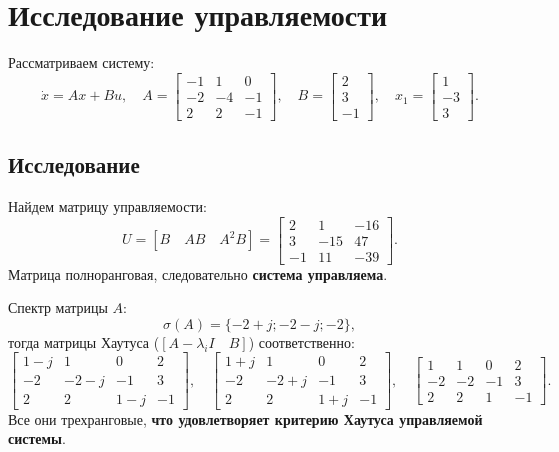 \section{Исследование управляемости}

Рассматриваем систему:
\begin{equation*}
    \dot x=Ax+Bu,\quad
    A=\begin{bmatrix}
        -1 & 1 & 0 \\ -2 & -4 & -1 \\ 2 & 2 & -1
    \end{bmatrix},\quad
    B=\begin{bmatrix}
        2 \\ 3 \\ -1
    \end{bmatrix},\quad
    x_1=\begin{bmatrix}
        1 \\ -3 \\ 3
    \end{bmatrix}.
\end{equation*}

\subsection{Исследование}

Найдем матрицу управляемости:
\begin{equation*}
    U=[B\quad AB\quad A^2B]=
    \begin{bmatrix}
        2 & 1 & -16 \\ 3 & -15 & 47 \\ -1 & 11 & -39
    \end{bmatrix}.
\end{equation*}
Матрица полноранговая, следовательно \textbf{система управляема}.

Спектр матрицы $A$:
$$\sigma(A)=\{ -2 + j; -2-j; -2\},$$
тогда матрицы Хаутуса ($[A-\lambda_iI\quad B]$) соответственно:
\begin{equation*}
    \begin{bmatrix}
        1-j&1&0&2\\-2&-2-j&-1&3\\2&2&1-j&-1
    \end{bmatrix},\quad 
    \begin{bmatrix}
        1+j&1&0&2\\-2&-2+j&-1&3\\2&2&1+j&-1
    \end{bmatrix},\quad
    \begin{bmatrix}
        1 & 1 & 0 & 2 \\
        -2 & -2 & -1 & 3 \\
        2 & 2 & 1 & -1
    \end{bmatrix}.
\end{equation*}
Все они трехранговые, \textbf{что удовлетворяет критерию Хаутуса управляемой системы}.

